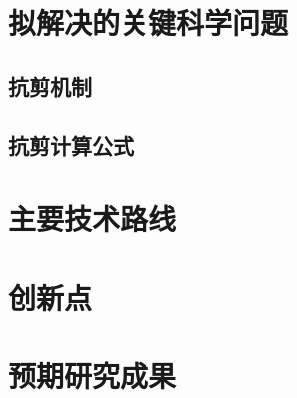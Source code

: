 \documentclass[a4paper,11pt]{article}
\begin{document}
\section{拟解决的关键科学问题}
\subsection{抗剪机制}
\subsection{抗剪计算公式}

\section{主要技术路线}

\section{创新点}

\section{预期研究成果}



\printbibliography
\end{document}
